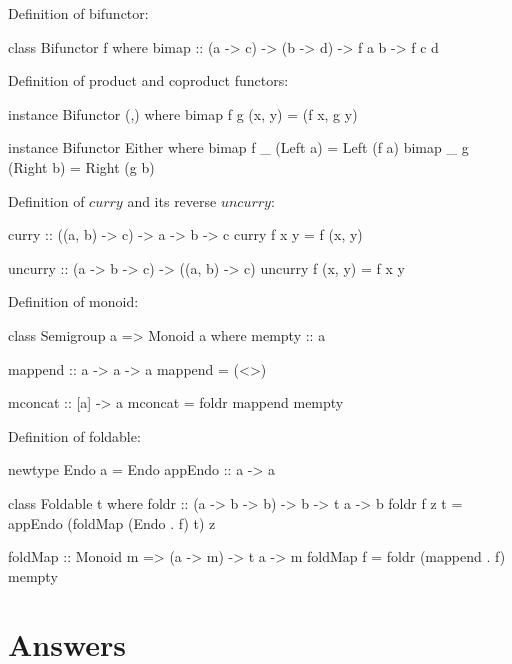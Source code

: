 \documentclass[b5paper]{article}
\begin{document}
Definition of bifunctor:

\begin{Haskell}
class Bifunctor f where
  bimap :: (a -> c) -> (b -> d) -> f a b -> f c d
\end{Haskell}

Definition of product and coproduct functors:

\begin{Haskell}
instance Bifunctor (,) where
  bimap f g (x, y) = (f x, g y)

instance Bifunctor Either where
  bimap f _ (Left a) = Left (f a)
  bimap _ g (Right b) = Right (g b)
\end{Haskell}

Definition of $curry$ and its reverse $uncurry$:

\begin{Haskell}
curry       :: ((a, b) -> c) -> a -> b -> c
curry f x y =  f (x, y)

uncurry     :: (a -> b -> c) -> ((a, b) -> c)
uncurry f (x, y) =  f x y
\end{Haskell}

Definition of monoid:

\begin{Haskell}
class Semigroup a => Monoid a where
    mempty  :: a

    mappend :: a -> a -> a
    mappend = (<>)

    mconcat :: [a] -> a
    mconcat = foldr mappend mempty
\end{Haskell}

Definition of foldable:

\begin{Haskell}
newtype Endo a = Endo { appEndo :: a -> a }

class Foldable t where
    foldr :: (a -> b -> b) -> b -> t a -> b
    foldr f z t = appEndo (foldMap (Endo . f) t) z

    foldMap :: Monoid m => (a -> m) -> t a -> m
    foldMap f = foldr (mappend . f) mempty
\end{Haskell}

\ifx\wholebook\relax \else
\section{Answers}
\shipoutAnswer
\end{document}
